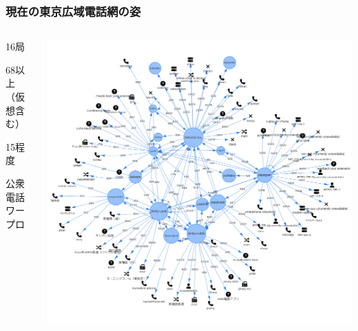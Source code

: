 \documentclass[
  lualatex,
  aspectratio=169,
  14pt
]{beamer}
\begin{document}
\begin{frame}
  \frametitle{現在の東京広域電話網の姿}

  \begin{columns}
    \begin{column}{.25\textwidth}
      \begin{description}[labelwidth=\linewidth]
        \item[交換局数]
          16局
        \item[端末数]
          68以上\\
          （仮想含む）
        \item[黒電話の数]
          15程度
        \item[その他]
          公衆電話\\
          ワープロ
      \end{description}
      ~
    \end{column}
    \begin{column}{.7\textwidth}
      \centering
      \includegraphics[height=\textheight]{./images/mantela.png}
    \end{column}
  \end{columns}
\end{frame}
\end{document}

